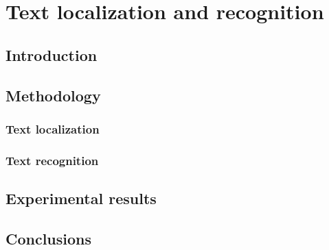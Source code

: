 \chapter{Text localization and recognition}
\label{chap:text_localization}
\graphicspath{{./chapters/5-te/figs/}}

\section{Introduction}


\section{Methodology}

\subsection{Text localization} %
\label{sub:text_localization}


\subsection{Text recognition} %
\label{sub:text_recognition}


\section{Experimental results}


\section{Conclusions}
